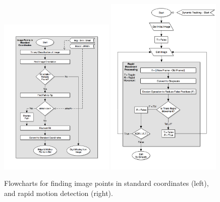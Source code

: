 \begin{figure}[h!]
  \centering
    \includegraphics[width=0.49\textwidth]{Chapter4/Figs/Fingerpress_Std_Coordinates.jpg}
    \includegraphics[width=0.49\textwidth]{Chapter4/Figs/Fingerpress_Rapid_Movement.jpg}
    \caption{Flowcharts for finding image points in standard coordinates (left), and rapid motion detection (right).}\label{fig:FingerpressStdCoordinates&RapidMovement}
\end{figure}

